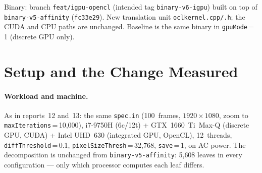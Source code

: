 \documentclass[
	english,
	letterpaper, oneside
]{article}
\begin{document}
\templatePagecfg
\templateFinalcfg

\inserttitle

\begin{center}\small\textsf{%
Binary: branch \texttt{feat/igpu-opencl} (intended tag \texttt{binary-v6-igpu})
built on top of \texttt{binary-v5-affinity} (\texttt{fc33e29}). New translation
unit \texttt{oclkernel.cpp/.h}; the CUDA and CPU paths are unchanged. Baseline is
the same binary in \texttt{gpuMode}\,=\,1 (discrete GPU only).%
}\end{center}

\begin{abstract}
The renderer used two executor classes --- the discrete GPU (CUDA) and a pool of
CPU worker threads. This report adds a third: an OpenCL backend
(\texttt{oclkernel.cpp}) that runs the FP64 Mandelbrot kernel on the
integrated GPU (Intel UHD~630, on the i7-9750H die). \texttt{compute()}
now dispatches by an \texttt{ExecKind} enum, both GPU backends share a result-copy
helper, and the iGPU runs on its own \texttt{CalcThr} with the same largest-first
affinity as the dGPU. Output is equivalent to the CUDA path to within FP
rounding (identical on shallow frames; at most 0.149\% of pixels per frame differ
on deep frames, 0.050\% over the run --- full-run verification in \S2.3).
The headline A/B (100~frames, $1920\times1080$, \texttt{diffT}\,=\,0.1,
\texttt{save}\,=\,1, 12~threads, 3~reps, on AC) measured a wall win, not
the predicted wash: \texttt{dGPU+iGPU+10CPU} 44.32~s vs.\
\texttt{dGPU+11CPU} 57.72~s, $-23.2\%$ (disjoint ranges; $-72.6\%$ vs.\ the
161.6~s CPU floor) --- and it wins while surrendering a CPU worker.
The mechanism is not the predicted ``GPU saturated'': the binding lane is the CPU
pool (busiest thread $\approx$ wall in every config), and the second GPU strips
total CPU compute from 622~s to 435~s ($-30\%$), faster than removing a CPU thread
raises per-thread load. The two GPUs self-balance (34.4~vs.\ 30.4~s kernel).
\end{abstract}

\section{Setup and the Change Measured}

\paragraph{Workload and machine.} As in reports~12 and~13: the same
\texttt{spec.in} (100~frames, $1920\times1080$, zoom to
\texttt{maxIterations}\,=\,10{,}000), i7-9750H (6c/12t) + GTX~1660~Ti~Max-Q
(discrete GPU, CUDA) + Intel UHD~630 (integrated GPU, OpenCL),
12~threads, \texttt{diffThreshold}\,=\,0.1, \texttt{pixelSizeThresh}\,=\,32{,}768,
\texttt{save}\,=\,1, on AC power. The decomposition is unchanged from
\texttt{binary-v5-affinity}: 5{,}608 leaves in every configuration ---
only which processor computes each leaf differs.
\end{document}
